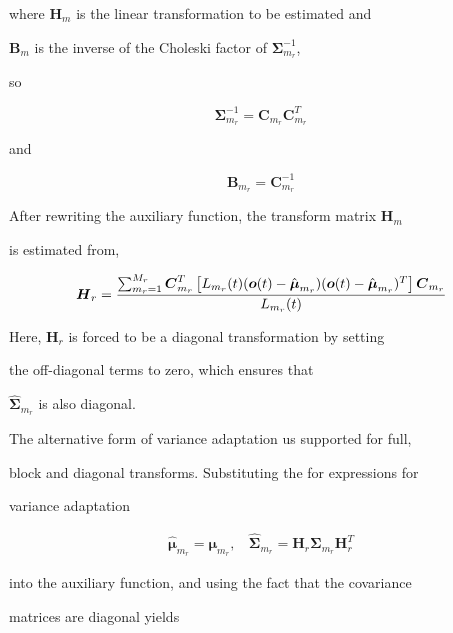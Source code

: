 where $\bm{H}_m$ is the linear transformation to be estimated and


$\bm{B}_m$ is the inverse of the Choleski factor of $\bm{\Sigma}_{m_r}^{-1}$,


so


\[ 


        \bm{\Sigma}_{m_r}^{-1} = \bm{C}_{m_r}\bm{C}_{m_r}^T


\]


and


\[


        \bm{B}_{m_r} = \bm{C}_{m_r}^{-1}


\]


After rewriting the auxiliary function, the transform matrix $\bm{H}_m$


is estimated from,


\[


        \bm{H}_r = \frac{ \sum_{m_r=1}^{M_r}\bm{C}_{m_r}^T \left[


                          \like(\bm{o}(t) - \hat{\bm{\mu}}_{m_r})


                          (\bm{o}(t) - \hat{\bm{\mu}}_{m_r})^T \right]


                          \bm{C}_{m_r} } { \like }


\]


Here, $\bm{H}_r$ is forced to be a diagonal transformation by setting


the off-diagonal terms to zero, which ensures that


$\hat{\bm{\Sigma}}_{m_r}$ is also diagonal.





The alternative form of variance adaptation us supported for full,


block and diagonal transforms. Substituting the for expressions for


variance adaptation


\begin{eqnarray}


\hat{\bm{\mu}}_{m_r} = \bm{\mu}_{m_r}, \:\:\:\: 


\hat{\bm{\Sigma}}_{m_r} = {\bm H}_r{\bm{\Sigma}}_{m_r}{\bm H}_r^T


\end{eqnarray}


into the auxiliary function, and using the fact that the covariance


matrices are diagonal yields


